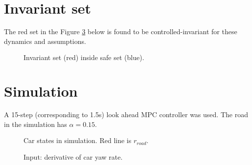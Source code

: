 \documentclass[letterpaper, 12pt]{article}
\newlength{\figurewidth}
\newlength{\figureheight}
\begin{document}
\section{Invariant set} %
\label{sec:invariant_set}

The red set in the Figure \ref{fig:invariant} below is found to be controlled-invariant for these dynamics and assumptions.

\setlength{} 
\setlength{} 

\begin{figure}[h]
	\begin{center}
		
	\end{center}
	\caption{Invariant set (red) inside safe set (blue).}
	\label{fig:invariant}
\end{figure}


\section{Simulation} %
\label{sec:simulation}

A 15-step (corresponding to 1.5s) look ahead MPC controller was used. The road in the simulation has $\alpha = 0.15$.

\setlength{} 
\setlength{} 

\begin{figure}[h]
	\begin{center}
		
	\end{center}
	\caption{Car states in simulation. Red line is $r_{road}$.}
	\label{fig:invariant}
\end{figure}
\setlength{} 
\setlength{} 

\begin{figure}[h]
	\begin{center}
		
	\end{center}
	\caption{Input: derivative of car yaw rate.}
	\label{fig:invariant}
\end{figure}
\end{document}
